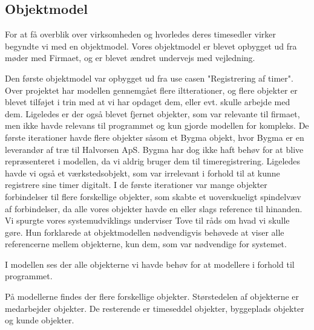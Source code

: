 \subsection{Objektmodel}

For at få overblik over virksomheden og hvorledes deres timesedler virker begyndte vi med en objektmodel. Vores objektmodel er blevet opbygget ud fra møder med Firmaet, og er blevet ændret undervejs med vejledning.

Den første objektmodel var opbygget ud fra use casen "Registrering af timer". Over projektet har modellen gennemgået flere iltterationer, og flere objekter er blevet tilføjet i trin med at vi har opdaget dem, eller evt. skulle arbejde med dem. Ligeledes er der også blevet fjernet objekter, som var relevante til firmaet, men ikke havde relevans til programmet og kun gjorde modellen for kompleks. De første iterationer havde flere objekter såsom et Bygma objekt, hvor Bygma er en leverandør af træ til Halvorsen ApS. Bygma har dog ikke haft behøv for at blive repræsenteret i modellen, da vi aldrig bruger dem til timeregistrering. Ligeledes havde vi også et værkstedsobjekt, som var irrelevant i forhold til at kunne registrere sine timer digitalt. I de første iterationer var mange objekter forbindelser til flere forskellige objekter, som skabte et uoverskueligt spindelvæv af forbindelser, da alle vores objekter havde en eller slags reference til hinanden. Vi spurgte vores systemudviklings underviser Tove til råds om hvad vi skulle gøre. Hun forklarede at objektmodellen nødvendigvis behøvede at viser alle referencerne mellem objekterne, kun dem, som var nødvendige for systemet.

I modellen ses der alle objekterne vi havde behøv for at modellere i forhold til programmet.

På modellerne findes der flere forskellige objekter. Størstedelen af objekterne er medarbejder objekter. De resterende er timeseddel objekter, byggeplads objekter og kunde objekter.